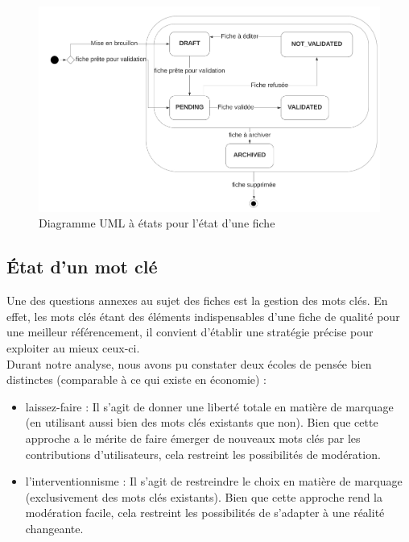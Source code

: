\begin{figure}[H]
    \includegraphics[width=\textwidth,height=\textheight,keepaspectratio]{images/StateFiches.png}
    \centering
    \caption{Diagramme UML à états pour l'état d'une fiche}
    \label{pic:stateDiagramForFiches}
\end{figure}

\subsection*{État d'un mot clé}

Une des questions annexes au sujet des fiches est la gestion des mots clés. En effet, les mots clés étant des éléments indispensables d'une fiche de qualité pour une meilleur référencement, il convient d'établir une stratégie précise pour exploiter au mieux ceux-ci. \\

Durant notre analyse, nous avons pu constater deux écoles de pensée bien distinctes (comparable à ce qui existe en économie) : 
\pagebreak
\begin{itemize}
    \item laissez-faire : Il s'agit de donner une liberté totale en matière de marquage (en utilisant aussi bien des mots clés existants que non). Bien que cette approche a le mérite de faire émerger de nouveaux mots clés par les contributions d'utilisateurs, cela restreint les possibilités de modération.
    \item l'interventionnisme : Il s'agit de restreindre le choix en matière de marquage (exclusivement des mots clés existants). Bien que cette approche rend la modération facile, cela restreint les possibilités de s'adapter à une réalité changeante.
\end{itemize}

